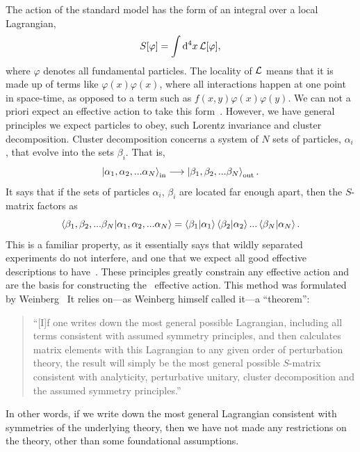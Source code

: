 The action of the standard model has the form of an integral over a local Lagrangian,
\begin{equation}
    S[\varphi] = \int \dd^4 x \, \mathcal{L}[\varphi],
\end{equation}
where $\varphi$ denotes all fundamental particles.
The locality of $\mathcal{L}$ means that it is made up of terms like $\varphi(x) \varphi(x)$, where all interactions happen at one point in space-time, as opposed to a term such as $f(x, y)\varphi(x) \varphi(y)$.
We can not a priori expect an effective action to take this form~\cite{Schwartz:QFT}.
However, we have general principles we expect particles to obey, such Lorentz invariance and cluster decomposition.
Cluster decomposition concerns a system of $N$ sets of particles, $\alpha_i$, that evolve into the sets $\beta_i$.
That is,
\begin{equation}
    \ket{\alpha_1, \alpha_2, ... \alpha_N}_\text{in}
    \longrightarrow
    \ket{\beta_1, \beta_2, ... \beta_N}_\text{out}.
\end{equation}
It says that if the sets of particles $\alpha_i$, $\beta_i$ are located far enough apart, then the $S$-matrix factors as
\begin{equation}
    {\braket{\beta_1, \beta_2, ... \beta_N}{\alpha_1, \alpha_2, ... \alpha_N}}
    =
    \braket{\beta_1}{\alpha_1}\braket{\beta_2}{\alpha_2}... \braket{\beta_N}{\alpha_N}.
\end{equation}
This is a familiar property, as it essentially says that wildly separated experiments do not interfere, and one that we expect all good effective descriptions to have~\cite{weinberg_1995,weinberg_1996_vol2}.
These principles greatly constrain any effective action and are the basis for constructing the \chpt\, effective action.
This method was formulated by Weinberg~\cite{WeinbergPhenom}
It relies on---as Weinberg himself called it---a ``theorem'':
\begin{quote}
    ``[I]f one writes down the most general possible Lagrangian, including all terms consistent with assumed symmetry principles, and then calculates matrix elements with this Lagrangian to any given order of perturbation theory, the result will simply be the most general possible $S$-matrix consistent with analyticity, perturbative unitary, cluster decomposition and the assumed symmetry principles.'' \cite{WeinbergPhenom}
\end{quote}
In other words, if we write down the most general Lagrangian consistent with symmetries of the underlying theory, then we have not made any restrictions on the theory, other than some foundational assumptions.

